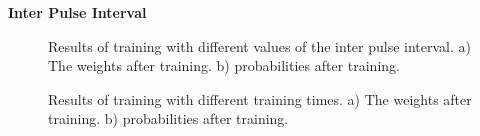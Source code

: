 \documentclass[10pt,a4paper]{article}
\begin{document}
\textbf{Inter Pulse Interval}

\begin{figure}[H]
    \centering
    \qquad
    \caption{Results of training with different values of the inter pulse interval. a) The weights after training. b) probabilities after training.}
    \label{fig:off_line_learning_IPI}%
\end{figure}

\begin{figure}[H]
    \centering
    \qquad
    \caption{Results of training with different training times. a) The weights after training. b) probabilities after training.}
    \label{fig:off_line_learning_IPI2}%
\end{figure}
\end{document}
